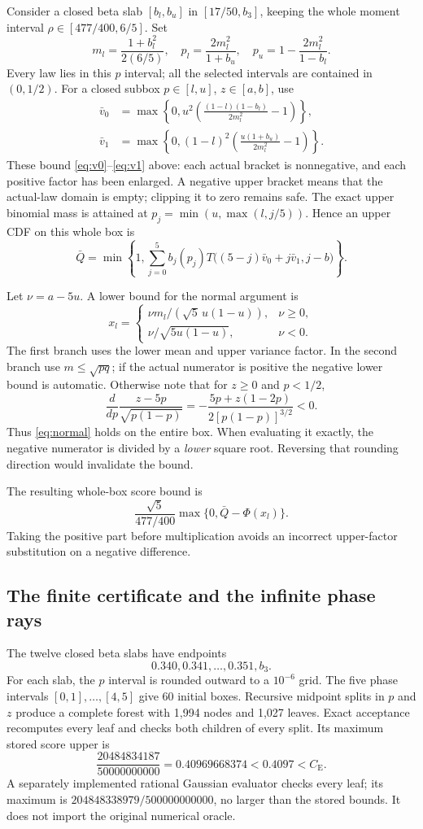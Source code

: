 \documentclass[11pt,a4paper]{article}
\theoremstyle{definition}
\newcommand{\CE}{C_{\mathrm E}}
\begin{document}
Consider a closed beta slab $[b_l,b_u]$ in $[17/50,b_3]$, keeping the
whole moment interval $\rho\in[477/400,6/5]$. Set
\[
 m_l=\frac{1+b_l^2}{2(6/5)},\quad
 p_l=\frac{2m_l^2}{1+b_u},\quad
 p_u=1-\frac{2m_l^2}{1-b_l}.
\]
Every law lies in this $p$ interval; all the selected intervals are contained
in $(0,1/2)$. For a closed subbox $p\in[l,u]$, $z\in[a,b]$, use
\begin{align*}
 \bar v_0&=\max\left\{0,u^2\left(\frac{(1-l)(1-b_l)}{2m_l^2}-1\right)\right\},\\
 \bar v_1&=\max\left\{0,(1-l)^2\left(\frac{u(1+b_u)}{2m_l^2}-1\right)\right\}.
\end{align*}
These bound \eqref{eq:v0}--\eqref{eq:v1} above: each actual bracket is
nonnegative, and each positive factor has been enlarged. A negative
upper bracket means that the actual-law domain is empty; clipping it to
zero remains safe. The exact upper binomial mass is attained at
$p_j=\min(u,\max(l,j/5))$. Hence an upper CDF on this whole box is
\[
 \bar Q=\min\left\{1,\sum_{j=0}^5 b_j(p_j)
 T\bigl((5-j)\bar v_0+j\bar v_1,j-b\bigr)\right\}.
\]

Let $\nu=a-5u$. A lower bound for the normal argument is
\begin{equation}\label{eq:normal}
 x_l=\begin{cases}
 \nu m_l/(\sqrt5\,u(1-u)),&\nu\ge0,\\
 \nu/\sqrt{5u(1-u)},&\nu<0.
 \end{cases}
\end{equation}
The first branch uses the lower mean and upper variance factor. In the
second branch use $m\le\sqrt{pq}$; if the actual numerator is positive
the negative lower bound is automatic. Otherwise note that for $z\ge0$
and $p<1/2$,
\[
 \frac{d}{dp}\frac{z-5p}{\sqrt{p(1-p)}}
 =-\frac{5p+z(1-2p)}{2[p(1-p)]^{3/2}}<0.
\]
Thus \eqref{eq:normal} holds on the entire box. When evaluating it exactly,
the negative numerator is divided by a \emph{lower} square root. Reversing
that rounding direction would invalidate the bound.

The resulting whole-box score bound is
\[
 \frac{\sqrt5}{477/400}\max\{0,\bar Q-\Phi(x_l)\}.
\]
Taking the positive part before multiplication avoids an incorrect
upper-factor substitution on a negative difference.

\subsection{The finite certificate and the infinite phase rays}
The twelve closed beta slabs have endpoints
\[
 0.340,0.341,\ldots,0.351,b_3.
\]
For each slab, the $p$ interval is rounded outward to a $10^{-6}$ grid.
The five phase intervals $[0,1],\ldots,[4,5]$ give 60 initial boxes.
Recursive midpoint splits in $p$ and $z$ produce a complete forest with
1,994 nodes and 1,027 leaves. Exact acceptance recomputes every leaf and
checks both children of every split. Its maximum stored score upper is
\[
 \frac{20484834187}{50000000000}=0.40969668374<0.4097<\CE.
\]
A separately implemented rational Gaussian evaluator checks every leaf;
its maximum is $204848338979/500000000000$, no larger than the stored
bounds. It does not import the original numerical oracle.
\end{document}
